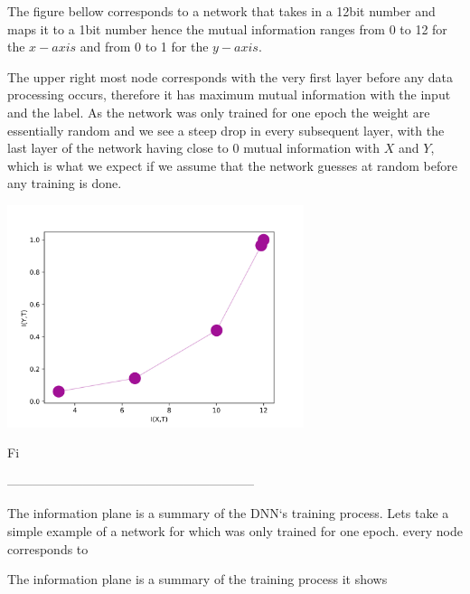 The figure bellow corresponds to a network that takes in a 12bit number and maps
it to a 1bit number hence the mutual information ranges from 0 to 12 for the $
x-axis $ and from 0 to 1 for the $ y-axis $.

The upper right most node corresponds with the very first layer before any data
processing occurs, therefore it has maximum mutual information with the input
and the label. As the network was only trained for one epoch the weight are
essentially random and we see a steep drop in every subsequent layer, with the
last layer of the network having close to 0 mutual information with $ X $ and $
Y $, which is what we expect if we assume that the network guesses at random
before any training is done.

\begin{center}
  \includegraphics[width=0.65\textwidth]{figs/ip_1v2.png}
\end{center}

Fi

-----------------------------------------------------------

The information plane is a summary of the DNN`s training process. Lets take a
simple example of a network for which was only trained for one epoch. every node
corresponds to  





















The information plane is a summary of the training process it shows 

